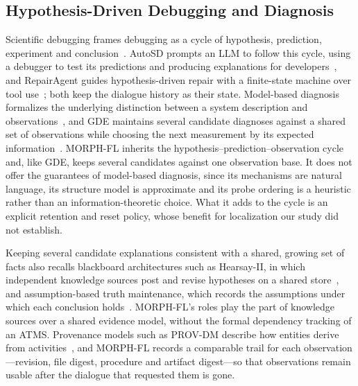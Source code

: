 \documentclass[a4paper,fleqn]{cas-sc}
\newcommand{\tool}{MORPH-FL}
\begin{document}
\subsection{Hypothesis-Driven Debugging and Diagnosis}
Scientific debugging frames debugging as a cycle of hypothesis, prediction, experiment and conclusion~\citep{zeller2009}. AutoSD prompts an LLM to follow this cycle, using a debugger to test its predictions and producing explanations for developers~\citep{autosd2023}, and RepairAgent guides hypothesis-driven repair with a finite-state machine over tool use~\citep{repairagent2025}; both keep the dialogue history as their state. Model-based diagnosis formalizes the underlying distinction between a system description and observations~\citep{reiter1987}, and GDE maintains several candidate diagnoses against a shared set of observations while choosing the next measurement by its expected information~\citep{gde1987}. \tool{} inherits the hypothesis--prediction--observation cycle and, like GDE, keeps several candidates against one observation base. It does not offer the guarantees of model-based diagnosis, since its mechanisms are natural language, its structure model is approximate and its probe ordering is a heuristic rather than an information-theoretic choice. What it adds to the cycle is an explicit retention and reset policy, whose benefit for localization our study did not establish.

Keeping several candidate explanations consistent with a shared, growing set of facts also recalls blackboard architectures such as Hearsay-II, in which independent knowledge sources post and revise hypotheses on a shared store~\citep{hearsay1980}, and assumption-based truth maintenance, which records the assumptions under which each conclusion holds~\citep{atms1986}. \tool{}'s roles play the part of knowledge sources over a shared evidence model, without the formal dependency tracking of an ATMS. Provenance models such as PROV-DM describe how entities derive from activities~\citep{prov2013}, and \tool{} records a comparable trail for each observation---revision, file digest, procedure and artifact digest---so that observations remain usable after the dialogue that requested them is gone.
\end{document}
